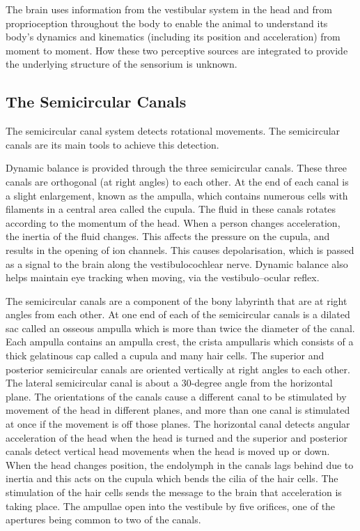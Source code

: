 The brain uses information from the vestibular system in the head and from proprioception throughout the body to enable the animal to understand its body's dynamics and kinematics (including its position and acceleration) from moment to moment. How these two perceptive sources are integrated to provide the underlying structure of the sensorium is unknown.

\hypertarget{the-semicircular-canals}{%
\subsection{The Semicircular Canals}\label{the-semicircular-canals}}

The semicircular canal system detects rotational movements. The semicircular canals are its main tools to achieve this detection.

Dynamic balance is provided through the three semicircular canals. These three canals are orthogonal (at right angles) to each other. At the end of each canal is a slight enlargement, known as the ampulla, which contains numerous cells with filaments in a central area called the cupula. The fluid in these canals rotates according to the momentum of the head. When a person changes acceleration, the inertia of the fluid changes. This affects the pressure on the cupula, and results in the opening of ion channels. This causes depolarisation, which is passed as a signal to the brain along the vestibulocochlear nerve. Dynamic balance also helps maintain eye tracking when moving, via the vestibulo--ocular reflex.

The semicircular canals are a component of the bony labyrinth that are at right angles from each other. At one end of each of the semicircular canals is a dilated sac called an osseous ampulla which is more than twice the diameter of the canal. Each ampulla contains an ampulla crest, the crista ampullaris which consists of a thick gelatinous cap called a cupula and many hair cells. The superior and posterior semicircular canals are oriented vertically at right angles to each other. The lateral semicircular canal is about a 30-degree angle from the horizontal plane. The orientations of the canals cause a different canal to be stimulated by movement of the head in different planes, and more than one canal is stimulated at once if the movement is off those planes. The horizontal canal detects angular acceleration of the head when the head is turned and the superior and posterior canals detect vertical head movements when the head is moved up or down. When the head changes position, the endolymph in the canals lags behind due to inertia and this acts on the cupula which bends the cilia of the hair cells. The stimulation of the hair cells sends the message to the brain that acceleration is taking place. The ampullae open into the vestibule by five orifices, one of the apertures being common to two of the canals.

